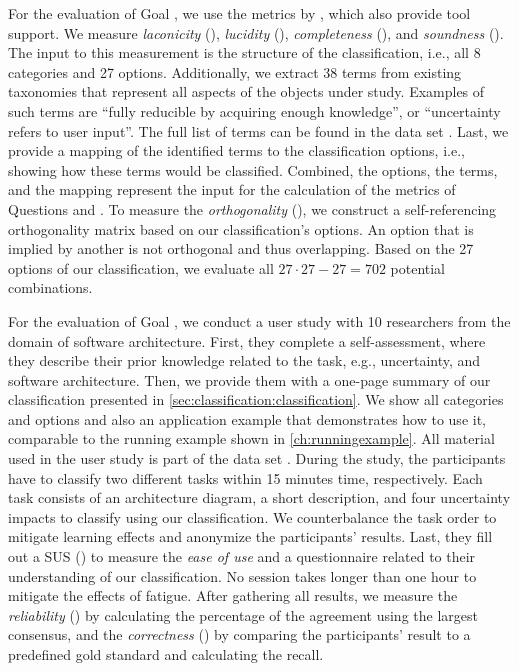 For the evaluation of Goal , we use the metrics by \textcite{kaplan_introducing_2022}, which also provide tool support.
We measure \emph{laconicity} (), \emph{lucidity} (), \emph{completeness} (), and \emph{soundness} ().
The input to this measurement is the structure of the classification, i.e., all 8 categories and 27 options.
Additionally, we extract 38 terms from existing taxonomies that represent all aspects of the objects under study.
Examples of such terms are \enquote{fully reducible by acquiring enough knowledge}, or \enquote{uncertainty refers to user input}.
The full list of terms can be found in the data set \cite{dataset}.
Last, we provide a mapping of the identified terms to the classification options, i.e., showing how these terms would be classified.
Combined, the options, the terms, and the mapping represent the input for the calculation of the metrics of Questions  and .
To measure the \emph{orthogonality} (), we construct a self-referencing orthogonality matrix based on our classification's options.
An option that is implied by another is not orthogonal and thus overlapping.
Based on the 27 options of our classification, we evaluate all $27 \cdot 27-27=702$ potential combinations.

For the evaluation of Goal , we conduct a user study with 10 researchers from the domain of software architecture.
First, they complete a self-assessment, where they describe their prior knowledge related to the task, e.g., uncertainty, and software architecture.
Then, we provide them with a one-page summary of our classification presented in \autoref{sec:classification:classification}.
We show all categories and options and also an application example that demonstrates how to use it, comparable to the running example shown in \autoref{ch:runningexample}.
All material used in the user study is part of the data set \cite{dataset}.
During the study, the participants have to classify two different tasks within 15 minutes time, respectively.
Each task consists of an architecture diagram, a short description, and four uncertainty impacts to classify using our classification.
We counterbalance the task order to mitigate learning effects and anonymize the participants' results.
Last, they fill out a \ac{SUS} () to measure the \emph{ease of use} and a questionnaire related to their understanding of our classification.
No session takes longer than one hour to mitigate the effects of fatigue.
After gathering all results, we measure the \emph{reliability} () by calculating the percentage of the agreement using the largest consensus, and the \emph{correctness} () by comparing the participants' result to a predefined gold standard and calculating the recall.

